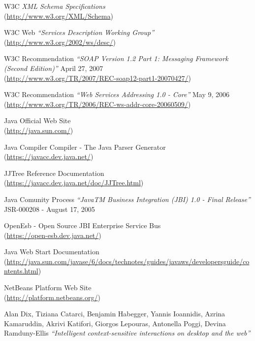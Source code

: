 \begin{thebibliography}{99}
 W3C \emph{XML Schema Specifications}\\
(\href{http://www.w3.org/XML/Schema}{http://www.w3.org/XML/Schema})

 W3C Web \emph{``Services Description Working Group''}\\
(\href{http://www.w3.org/2002/ws/desc/}{http://www.w3.org/2002/ws/desc/})

 W3C Recommendation \emph{``SOAP Version 1.2 Part 1: Messaging
Framework (Second Edition)''} April 27, 2007\\
(\href{http://www.w3.org/TR/2007/REC-soap12-part1-20070427/}{http://www.w3.org/TR/2007/REC-soap12-part1-20070427/})

  W3C Recommendation \emph{``Web Services Addressing 1.0
- Core''} May 9, 2006 \\
(\href{http://www.w3.org/TR/2006/REC-ws-addr-core-20060509/}{http://www.w3.org/TR/2006/REC-ws-addr-core-20060509/})

 Java Official Web Site \\ 
(\href{http://java.sun.com/}{http://java.sun.com/})

 Java Compiler Compiler - The Java Parser
Generator \\ (\href{https://javacc.dev.java.net/}{https://javacc.dev.java.net/})

 JJTree Reference Documentation\\
(\href{https://javacc.dev.java.net/doc/JJTree.html}{https://javacc.dev.java.net/doc/JJTree.html})

 Java Comunity Process \emph{``JavaTM Business Integration (JBI)
1.0 - Final Release''} JSR-000208 - August 17, 2005

 OpenEsb - Open Source JBI Enterprise Service Bus \\
(\href{https://open-esb.dev.java.net/}{https://open-esb.dev.java.net/})

 Java Web Start Documentation \\
(\href{http://java.sun.com/javase/6/docs/technotes/guides/javaws/developersguide/contents.html}{http://java.sun.com/javase/6/docs/technotes/guides/javaws/developersguide/contents.html})

 NetBeans Platform Web Site \\
(\href{http://platform.netbeans.org/}{http://platform.netbeans.org/})

 Alan Dix, Tiziana Catarci, Benjamin Habegger,
Yannis Ioannidis, Azrina Kamaruddin, Akrivi Katifori, Giorgos Lepouras, Antonella Poggi, Devina Ramduny-Ellis
\emph{``Intelligent context-sensitive interactions on desktop and the web''}


\end{thebibliography}
